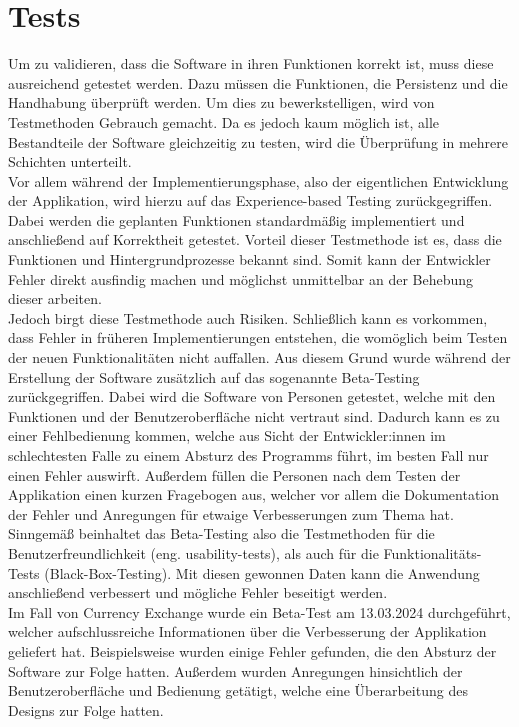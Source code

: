 \documentclass[conference]{IEEEtran}
\begin{document}
\section{Tests}
Um zu validieren, dass die Software in ihren Funktionen korrekt ist, muss diese ausreichend getestet werden. Dazu müssen die Funktionen, die Persistenz und die Handhabung überprüft werden. Um dies zu bewerkstelligen, wird von Testmethoden Gebrauch gemacht. Da es jedoch kaum möglich ist, alle Bestandteile der Software gleichzeitig zu testen, wird die Überprüfung in mehrere Schichten unterteilt.\\
Vor allem während der Implementierungsphase, also der eigentlichen Entwicklung der Applikation, wird hierzu auf das Experience-based Testing zurückgegriffen. Dabei werden die geplanten Funktionen standardmäßig implementiert und anschließend auf Korrektheit getestet. Vorteil dieser Testmethode ist es, dass die Funktionen und Hintergrundprozesse bekannt sind. Somit kann der Entwickler Fehler direkt ausfindig machen und möglichst unmittelbar an der Behebung dieser arbeiten.\\
Jedoch birgt diese Testmethode auch Risiken. Schließlich kann es vorkommen, dass Fehler in früheren Implementierungen entstehen, die womöglich beim Testen der neuen Funktionalitäten nicht auffallen. Aus diesem Grund wurde während der Erstellung der Software zusätzlich auf das sogenannte Beta-Testing zurückgegriffen. Dabei wird die Software von Personen getestet, welche mit den Funktionen und der Benutzeroberfläche nicht vertraut sind. Dadurch kann es zu einer Fehlbedienung kommen, welche aus Sicht der Entwickler:innen im schlechtesten Falle zu einem Absturz des Programms führt, im besten Fall nur einen Fehler auswirft. Außerdem füllen die Personen nach dem Testen der Applikation einen kurzen Fragebogen aus, welcher vor allem die Dokumentation der Fehler und Anregungen für etwaige Verbesserungen zum Thema hat. Sinngemäß beinhaltet das Beta-Testing also die Testmethoden für die Benutzerfreundlichkeit (eng. usability-tests), als auch für die Funktionalitäts-Tests (Black-Box-Testing).
Mit diesen gewonnen Daten kann die Anwendung anschließend verbessert  und mögliche Fehler beseitigt werden. \\
Im Fall von Currency Exchange wurde ein Beta-Test am 13.03.2024 durchgeführt, welcher aufschlussreiche Informationen über die Verbesserung der Applikation geliefert hat. Beispielsweise wurden einige Fehler gefunden, die den Absturz der Software zur Folge hatten. Außerdem wurden Anregungen hinsichtlich der Benutzeroberfläche und Bedienung getätigt, welche eine Überarbeitung des Designs zur Folge hatten.
\end{document}
